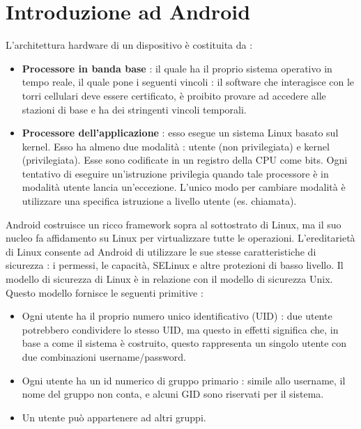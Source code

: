 \documentclass[12pt]{report}
\begin{document}
\chapter{Introduzione ad Android}
L'architettura hardware di un dispositivo è costituita da :
\begin{itemize}
\item \textbf{Processore in banda base} : il quale ha il proprio sistema operativo in tempo reale, il quale pone i seguenti vincoli : il software che interagisce con le torri cellulari deve essere certificato, è proibito provare ad accedere alle stazioni di base e ha dei stringenti vincoli temporali.
\item \textbf{Processore dell'applicazione} : esso esegue un sistema Linux basato sul kernel. Esso ha almeno due modalità : utente (non privilegiata) e kernel (privilegiata). Esse sono codificate in un registro della CPU come bits. Ogni tentativo di eseguire un'istruzione privilegia quando tale processore è in modalità utente lancia un'eccezione. L'unico modo per cambiare modalità è utilizzare una specifica istruzione a livello utente (es. chiamata). 
\end{itemize}
Android costruisce un ricco framework sopra al sottostrato di Linux, ma il suo nucleo fa affidamento su Linux per virtualizzare tutte le operazioni. L'ereditarietà di Linux consente ad Android di utilizzare le sue stesse caratteristiche di sicurezza : i permessi, le capacità, SELinux e altre protezioni di basso livello. Il modello di sicurezza di Linux è in relazione con il modello di sicurezza Unix. Questo modello fornisce le seguenti primitive :
\begin{itemize}
\item Ogni utente ha il proprio numero unico identificativo (UID) : due utente potrebbero condividere lo stesso UID, ma questo in effetti significa che, in base a come il sistema è costruito, questo rappresenta un singolo utente con due combinazioni username/password.
\item Ogni utente ha un id numerico di gruppo primario : simile allo username, il nome del gruppo non conta, e alcuni GID sono riservati per il sistema.
\item Un utente può appartenere ad altri gruppi.
\end{itemize}
\end{document}
